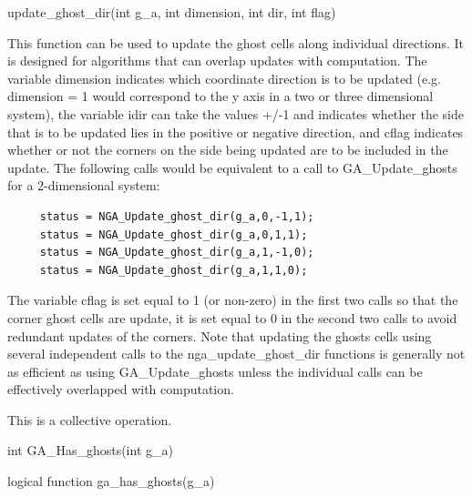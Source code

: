 \documentclass[12pt]{article}
\begin{document}
\begin{pyapi}
\begin{pycode}
update_ghost_dir(int g_a, int dimension, int dir, int flag)
\end{pycode}
\end{pyapi}

\begin{desc}

  This function can be used to update the ghost cells along individual
  directions. It is designed for algorithms that can overlap updates
  with computation. The variable dimension indicates which coordinate
  direction is to be updated (e.g. dimension = 1 would correspond to
  the y axis in a two or three dimensional system), the variable idir
  can take the values +/-1 and indicates whether the side that is to
  be updated lies in the positive or negative direction, and cflag
  indicates whether or not the corners on the side being updated are
  to be included in the update. The following calls would be
  equivalent to a call to GA_Update_ghosts for a 2-dimensional system:

\begin{verbatim}
     status = NGA_Update_ghost_dir(g_a,0,-1,1);
     status = NGA_Update_ghost_dir(g_a,0,1,1);
     status = NGA_Update_ghost_dir(g_a,1,-1,0);
     status = NGA_Update_ghost_dir(g_a,1,1,0);
\end{verbatim}

         The variable cflag is set equal to 1 (or non-zero) in the
         first two calls so that the corner ghost cells are update, it
         is set equal to 0 in the second two calls to avoid redundant
         updates of the corners. Note that updating the ghosts cells
         using several independent calls to the nga_update_ghost_dir
         functions is generally not as efficient as using
         GA_Update_ghosts unless the individual calls can be
         effectively overlapped with computation.

This is a  collective operation.

\end{desc}


\begin{capi}
\begin{ccode}
int GA_Has_ghosts(int g_a)
\end{ccode}
\end{capi}

\begin{fapi}
\begin{fcode}
logical function ga_has_ghosts(g_a)
\end{fcode}
\begin{funcargs}
\end{funcargs}
\end{fapi}
\end{document}
